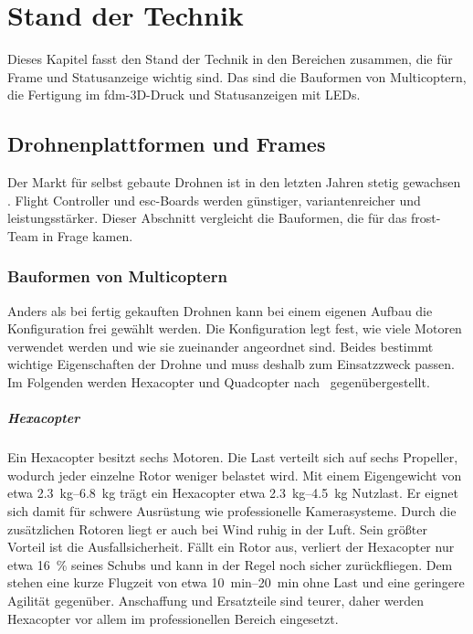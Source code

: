 \chapter{Stand der Technik}
\label{ch:StandDerTechnik}

Dieses Kapitel fasst den Stand der Technik in den Bereichen zusammen, die für Frame und Statusanzeige wichtig sind. Das sind die Bauformen von Multicoptern, die Fertigung im \gls{fdm}-3D-Druck und Statusanzeigen mit LEDs.

    \section{Drohnenplattformen und Frames}
    \label{sec:SdT_Drohnen}

    Der Markt für selbst gebaute Drohnen ist in den letzten Jahren stetig gewachsen \cite{getfpvHistoryFPV}. Flight Controller und \gls{esc}-Boards werden günstiger, variantenreicher und leistungsstärker. Dieser Abschnitt vergleicht die Bauformen, die für das \gls{frost}-Team in Frage kamen.

        \subsection{Bauformen von Multicoptern}
        \label{sec:SdT_Bauformen}

        Anders als bei fertig gekauften Drohnen kann bei einem eigenen Aufbau die Konfiguration frei gewählt werden. Die Konfiguration legt fest, wie viele Motoren verwendet werden und wie sie zueinander angeordnet sind. Beides bestimmt wichtige Eigenschaften der Drohne und muss deshalb zum Einsatzzweck passen. Im Folgenden werden Hexacopter und Quadcopter nach~\cite{petersonQuadcopterVsHexacopter} gegenübergestellt.

        \paragraph{Hexacopter}
        Ein Hexacopter besitzt sechs Motoren. Die Last verteilt sich auf sechs Propeller, wodurch jeder einzelne Rotor weniger belastet wird. Mit einem Eigengewicht von etwa \SIrange{2,3}{6,8}{\kilo\gram} trägt ein Hexacopter etwa \SIrange{2,3}{4,5}{\kilo\gram} Nutzlast. Er eignet sich damit für schwere Ausrüstung wie professionelle Kamerasysteme. Durch die zusätzlichen Rotoren liegt er auch bei Wind ruhig in der Luft. Sein größter Vorteil ist die Ausfallsicherheit. Fällt ein Rotor aus, verliert der Hexacopter nur etwa \SI{16}{\percent} seines Schubs und kann in der Regel noch sicher zurückfliegen. Dem stehen eine kurze Flugzeit von etwa \SIrange{10}{20}{\minute} ohne Last und eine geringere Agilität gegenüber. Anschaffung und Ersatzteile sind teurer, daher werden Hexacopter vor allem im professionellen Bereich eingesetzt.


